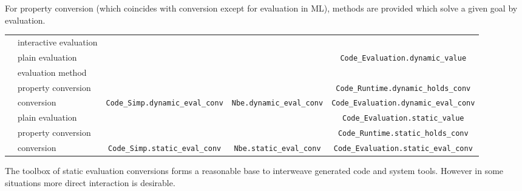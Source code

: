 \begin{isabellebody}
\begin{isamarkuptext}
  For property conversion (which coincides with conversion except for
  evaluation in ML), methods are provided which solve a given goal by
  evaluation.%
\end{isamarkuptext}%
\isamarkuptrue%
%
\isamarkuptrue%
%
\begin{isamarkuptext}%
\newcommand{\ttsize}{\fontsize{5.8pt}{8pt}\selectfont}
  \fontsize{9pt}{12pt}\selectfont
  \begin{tabular}{ll||c|c|c}
    & & \isa{simp} & \isa{nbe} & \isa{code} \tabularnewline \hline \hline
    \multirow{5}{1ex}{\rotatebox{90}{dynamic}}
      & interactive evaluation 
      & \hyperlink{command.value}{\mbox{\isa{\isacommand{value}}}} \isa{{\isacharbrackleft}simp{\isacharbrackright}} & \hyperlink{command.value}{\mbox{\isa{\isacommand{value}}}} \isa{{\isacharbrackleft}nbe{\isacharbrackright}} & \hyperlink{command.value}{\mbox{\isa{\isacommand{value}}}} \isa{{\isacharbrackleft}code{\isacharbrackright}}
      \tabularnewline
    & plain evaluation & & & \ttsize\verb|Code_Evaluation.dynamic_value| \tabularnewline \cline{2-5}
    & evaluation method & \hyperlink{method.code-simp}{\mbox{\isa{code{\isacharunderscore}simp}}} & \hyperlink{method.normalization}{\mbox{\isa{normalization}}} & \hyperlink{method.eval}{\mbox{\isa{eval}}} \tabularnewline
    & property conversion & & & \ttsize\verb|Code_Runtime.dynamic_holds_conv| \tabularnewline \cline{2-5}
    & conversion & \ttsize\verb|Code_Simp.dynamic_eval_conv| & \ttsize\verb|Nbe.dynamic_eval_conv|
      & \ttsize\verb|Code_Evaluation.dynamic_eval_conv| \tabularnewline \hline \hline
    \multirow{3}{1ex}{\rotatebox{90}{static}}
      & plain evaluation & & & \ttsize\verb|Code_Evaluation.static_value| \tabularnewline \cline{2-5}
    & property conversion & &
      & \ttsize\verb|Code_Runtime.static_holds_conv| \tabularnewline \cline{2-5}
    & conversion & \ttsize\verb|Code_Simp.static_eval_conv|
      & \ttsize\verb|Nbe.static_eval_conv|
      & \ttsize\verb|Code_Evaluation.static_eval_conv|
  \end{tabular}%
\end{isamarkuptext}%
\isamarkuptrue%
%
\isamarkuptrue%
%
\begin{isamarkuptext}%
The toolbox of static evaluation conversions forms a reasonable base
  to interweave generated code and system tools.  However in some
  situations more direct interaction is desirable.%
\end{isamarkuptext}%

\end{isabellebody}

